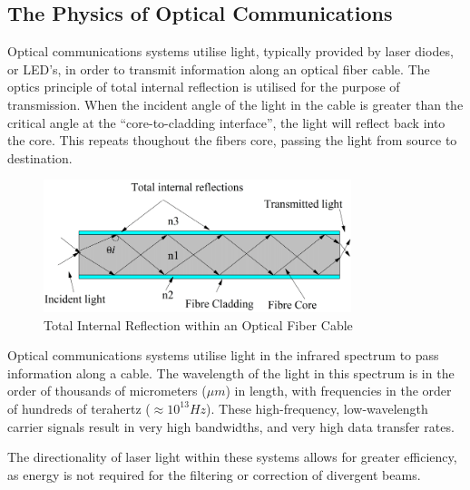\subsection{The Physics of Optical Communications}

Optical communications systems utilise light, typically provided by laser
diodes, or LED's, in order to transmit information along an optical fiber cable.
The optics principle of total internal reflection is utilised for the purpose of
transmission. When the incident angle of the light in the cable is greater than
the critical angle at the ``core-to-cladding interface''\cite{alwayn_2004}, the
light will reflect back into the core. This repeats thoughout the fibers core,
passing the light from source to destination.

\begin{figure}[H]
	\centering
	\includegraphics[width=0.8\textwidth]{images/tir}
	\caption{Total Internal Reflection within an Optical Fiber
	Cable\cite{memon_2018}}
	\label{fig:tir}
\end{figure}

\par Optical communications systems utilise light in the infrared spectrum to pass
information along a cable. The wavelength of the light in this spectrum is
in the order of thousands of micrometers ($\mu m$) in length, with frequencies
in the order of hundreds of terahertz ($\approx 10^{13}Hz$). These
high-frequency, low-wavelength carrier signals result in very high bandwidths,
and very high data transfer rates\cite{mickelson_2003}.

\par The directionality of laser light within these systems allows for greater
efficiency, as energy is not required for the filtering or correction of
divergent beams\cite{mickelson_2003}.
